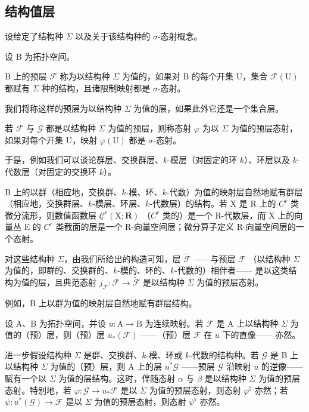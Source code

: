 \subsection{结构值层}

设给定了结构种 \(\Sigma\) 以及关于该结构种的 \(\sigma\)-态射概念。

设 B 为拓扑空间。

B 上的预层 \(\mathcal{F}\) 称为以结构种 \(\Sigma\) 为值的，如果对 B 的每个开集 U，集合 \(\mathcal{F}(\mathrm{U})\) 都赋有 \(\Sigma\) 种的结构，且诸限制映射都是 \(\sigma\)-态射。

我们将称这样的预层为以结构种 \(\Sigma\) 为值的层，如果此外它还是一个集合层。

若 \(\mathcal{F}\) 与 \(\mathcal{G}\) 都是以结构种 \(\Sigma\) 为值的预层，则称态射 \(\varphi\) 为以 \(\Sigma\) 为值的预层态射，如果对每个开集 U，映射 \(\varphi(\mathrm{U})\) 都是 \(\sigma\)-态射。

于是，例如我们可以谈论群层、交换群层、\(k\)-模层（对固定的环 \(k\)）、环层以及 \(k\)-代数层（对固定的交换环 \(k\)）。

B 上的以群（相应地，交换群、\(k\)-模、环、\(k\)-代数）为值的映射层自然地赋有群层（相应地，交换群层、\(k\)-模层、环层、\(k\)-代数层）的结构。若 X 是 R 上的 \(C^{r}\) 类微分流形，则数值函数层 \(\underline{\mathcal{C}}^{r}(\mathrm{X};\mathbf{R})\) （\(C^{r}\) 类的）是一个 R-代数层，而 X 上的向量丛 E 的 \(C^{r}\) 类截面的层是一个 R-向量空间层；微分算子定义 R-向量空间层的一个态射。

对这些结构种 \(\Sigma\)，由我们所给出的构造可知，层 \(\widetilde{\mathcal{F}}\) ——与预层 \(\mathcal{F}\) （以结构种 \(\Sigma\) 为值的，即群的、交换群的、\(k\)-模的、环的、\(k\)-代数的）相伴者—— 是以这类结构为值的层，且典范态射 \(j_{\mathcal{F}}: \mathcal{F} \to \widetilde{\mathcal{F}}\) 是以结构种 \(\Sigma\) 为值的预层态射。

例如，B 上以群为值的映射层自然地赋有群层结构。

设 A、B 为拓扑空间，并设 \(u\colon\mathrm{A}\to\mathrm{B}\) 为连续映射。若 \(\mathcal{F}\) 是 A 上以结构种 \(\Sigma\) 为值的（预）层，则（预）层 \(u_{*}(\mathcal{F})\) ——（预）层 \(\mathcal{F}\) 在 \(u\) 下的直像—— 亦然。

进一步假设结构种 \(\Sigma\) 是群、交换群、\(k\)-模、环或 \(k\)-代数的结构种。若 \(\mathcal{G}\) 是 B 上以结构种 \(\Sigma\) 为值的（预）层，则 A 上的层 \(u^{*}\mathcal{G}\) ——预层 \(\mathcal{G}\) 沿映射 \(u\) 的逆像—— 赋有一个以 \(\Sigma\) 为值的层结构。这时，伴随态射 \(\alpha\) 与 \(\beta\) 是以结构种 \(\Sigma\) 为值的预层态射。特别地，若 \(\varphi: \mathcal{G} \to u_{*}\mathcal{F}\) 是以 \(\Sigma\) 为值的预层态射，则态射 \(\varphi^{\sharp}\) 亦然；若 \(\psi: u^{*}(\mathcal{G}) \to \mathcal{F}\) 是以 \(\Sigma\) 为值的预层态射，则态射 \(\psi^{\flat}\) 亦然。

